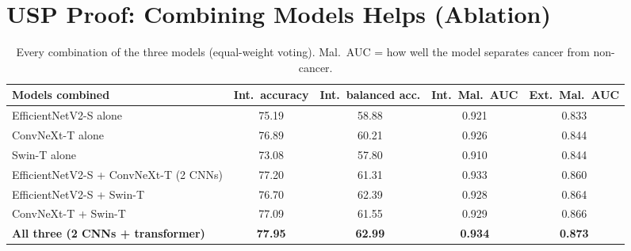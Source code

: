 \documentclass[10.5pt,a4paper]{article}
\begin{document}
\section{USP Proof: Combining Models Helps (Ablation)}
\begin{table}[H]
\centering
\caption{Every combination of the three models (equal-weight voting). Mal.\ AUC = how well the model separates cancer from non-cancer.}
\renewcommand{\arraystretch}{1.2}
\small
\begin{tabular}{@{}l c c c c@{}}
\toprule
\textbf{Models combined} & \textbf{Int.\ accuracy} & \textbf{Int.\ balanced acc.} & \textbf{Int.\ Mal.\ AUC} & \textbf{Ext.\ Mal.\ AUC} \\
\midrule
EfficientNetV2-S alone & 75.19 & 58.88 & 0.921 & 0.833 \\
ConvNeXt-T alone & 76.89 & 60.21 & 0.926 & 0.844 \\
Swin-T alone & 73.08 & 57.80 & 0.910 & 0.844 \\
\midrule
EfficientNetV2-S + ConvNeXt-T (2 CNNs) & 77.20 & 61.31 & 0.933 & 0.860 \\
EfficientNetV2-S + Swin-T & 76.70 & 62.39 & 0.928 & 0.864 \\
ConvNeXt-T + Swin-T & 77.09 & 61.55 & 0.929 & 0.866 \\
\midrule
\textbf{All three (2 CNNs + transformer)} & \textbf{77.95} & \textbf{62.99} & \textbf{0.934} & \textbf{0.873} \\
\bottomrule
\end{tabular}
\end{table}
\end{document}
